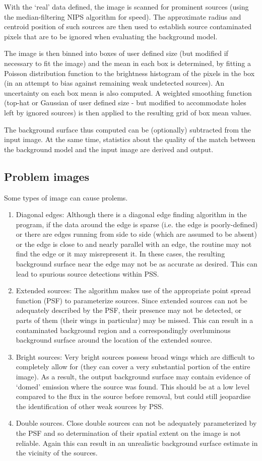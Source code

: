 \documentclass{book}
\renewcommand{\_}{{\tt\char'137}}     %
\begin{document}
With the `real' data defined, the image is scanned for prominent sources
(using the median-filtering NIPS algorithm for speed). The approximate
radius and centroid position of such sources are then used to establish
source contaminated pixels that are to be ignored when evaluating the
background model.
 
The image is then binned into boxes of user defined size (but modified
if necessary to fit the image) and the mean in each box is determined,
by fitting a Poisson distribution function to the brightness histogram
of the pixels in the box (in an attempt to bias against remaining
weak undetected sources). An uncertainty on each box mean is also computed.
A weighted smoothing function (top-hat or Gaussian of user defined size
- but modified to accommodate holes left by ignored sources) is then applied
to the resulting grid of box mean values.
 
The background surface thus computed can be (optionally) subtracted from the
input image. At the same time, statistics about the quality of the
match between the background model and the input image are derived and
output.
 
\subsection{Problem images}
Some types of image can cause prolems.
 
\begin{enumerate}
\item Diagonal edges: Although there is a diagonal edge finding algorithm
in the program, if the data around the edge is sparse (i.e. the
edge is poorly-defined) or there are edges running from side to
side (which are assumed to be absent) or the edge is close to and
nearly parallel with an edge, the routine may not find the edge or it
may misrepresent it. In these cases, the resulting background surface
near the edge may not be as accurate as desired. This can lead to
spurious source detections within PSS.
\item Extended sources: The algorithm makes use of the appropriate point
spread function (PSF) to parameterize sources. Since extended
sources can not be adequately described by the PSF, their presence
may not be detected, or parts of them (their wings in particular)
may be missed. This can result in a contaminated background
region and a correspondingly overluminous background surface
around the location of the extended source.
\item Bright sources: Very bright sources possess broad wings which
are difficult to completely allow for (they can cover a very
substantial portion of the entire image). As a result, the
output background surface may contain evidence of `domed'
emission where the source was found. This should be at a
low level compared to the flux in the source before removal,
but could still jeopardise the identification of other weak
sources by PSS.
\item Double sources. Close double sources can not be adequately
parameterized by the PSF and so determination of their
spatial extent on the image is not reliable. Again this
can result in an unrealistic background surface estimate
in the vicinity of the sources.
\end{enumerate}
\end{document}
